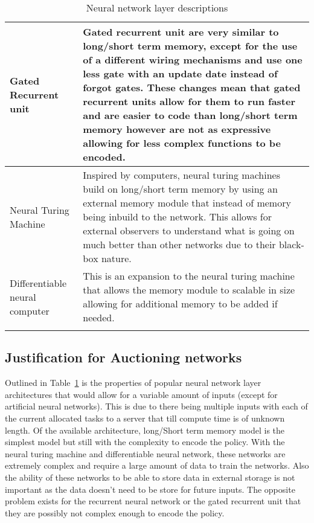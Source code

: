 \begin{longtable}{|p{3.5cm}|p{11cm}|}
    Gated Recurrent unit~\cite{GRU} & Gated recurrent unit are very similar to long/short term memory, except for the
        use of a different wiring mechanisms and use one less gate with an update date instead of forgot gates.
        These changes mean that gated recurrent units allow for them to run faster and are easier to code than
        long/short term memory however are not as expressive allowing for less complex functions to be encoded. \\ \hline

    Neural Turing Machine~\cite{NTM} & Inspired by computers, neural turing machines build on long/short term memory
        by using an external memory module that instead of memory being inbuild to the network. This allows for
        external observers to understand what is going on much better than other networks due to their
        black-box nature. \\ \hline

    Differentiable neural computer~\cite{DNC} & This is an expansion to the neural turing machine that allows the
        memory module to scalable in size allowing for additional memory to be added if needed. \\ \hline
    \caption{Neural network layer descriptions}
    \label{tab:neural_network_layers}
\end{longtable}

\subsection{Justification for Auctioning networks}\label{subsec:justification-for-auctioning-networks}
Outlined in Table~\ref{tab:neural_network_layers} is the properties of popular neural network layer architectures that
would allow for a variable amount of inputs (except for artificial neural networks). This is due to there being
multiple inputs with each of the current allocated tasks to a server that till compute time is of unknown length. Of
the available architecture, long/Short term memory model is the simplest model but still with the complexity to encode
the policy. With the neural turing machine and differentiable neural network, these networks are extremely complex and
require a large amount of data to train the networks. Also the ability of these networks to be able to store data in
external storage is not important as the data doesn't need to be store for future inputs. The opposite problem exists
for the recurrent neural network or the gated recurrent unit that they are possibly not complex enough to encode the
policy.

